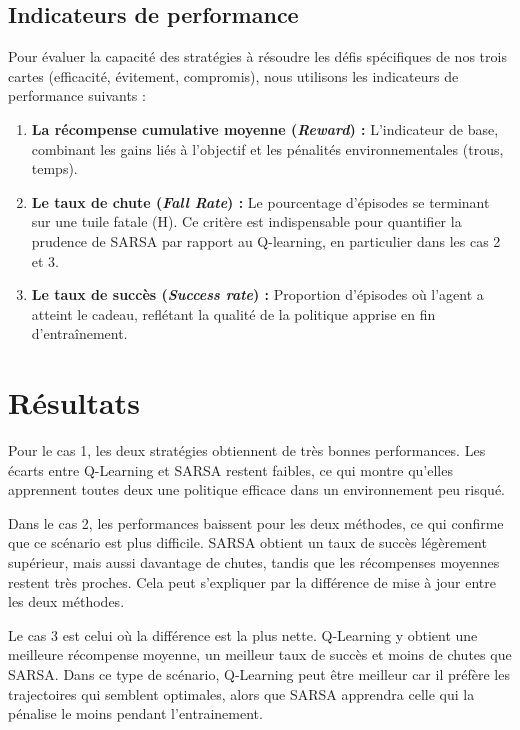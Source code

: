 \documentclass{article}
\begin{document}
\subsection{Indicateurs de performance}

Pour évaluer la capacité des stratégies à résoudre les défis spécifiques de nos trois cartes (efficacité, évitement, compromis), nous utilisons les indicateurs de performance suivants :
\begin{enumerate}[noitemsep, topsep=0pt]
    \item \textbf{La récompense cumulative moyenne (\textit{Reward}) :} L'indicateur de base, combinant les gains liés à l'objectif et les pénalités environnementales (trous, temps).
    \item \textbf{Le taux de chute (\textit{Fall Rate}) :} Le pourcentage d'épisodes se terminant sur une tuile fatale (H). Ce critère est indispensable pour quantifier la prudence de SARSA par rapport au Q-learning, en particulier dans les cas 2 et 3.
    \item \textbf{Le taux de succès (\textit{Success rate}) :} Proportion d'épisodes où l'agent a atteint le cadeau, reflétant la qualité de la politique apprise en fin d'entraînement.
\end{enumerate}

\section{Résultats}

Pour le cas 1, les deux stratégies obtiennent de très bonnes performances. Les écarts entre Q-Learning et SARSA restent faibles, ce qui montre qu’elles apprennent toutes deux une politique efficace dans un environnement peu risqué.

Dans le cas 2, les performances baissent pour les deux méthodes, ce qui confirme que ce scénario est plus difficile. SARSA obtient un taux de succès légèrement supérieur, mais aussi davantage de chutes, tandis que les récompenses moyennes restent très proches. Cela peut s’expliquer par la différence de mise à jour entre les deux méthodes.

Le cas 3 est celui où la différence est la plus nette. Q-Learning y obtient une meilleure récompense moyenne, un meilleur taux de succès et moins de chutes que SARSA. Dans ce type de scénario, Q-Learning peut être meilleur car il préfère les trajectoires qui semblent optimales, alors que SARSA apprendra celle qui la pénalise le moins pendant l'entrainement.
\end{document}
